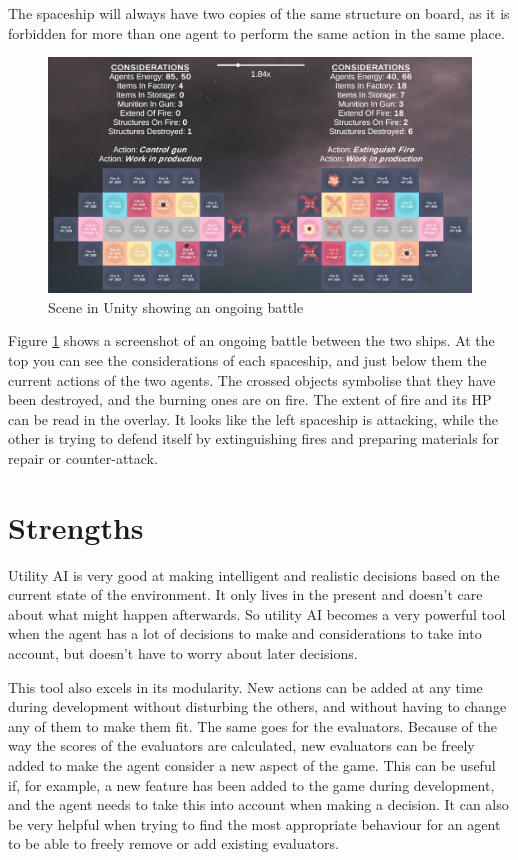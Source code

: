 The spaceship will always have two copies of the same structure on board, as it is forbidden for more than one agent to perform the same action in the same place.

\begin{figure}[H]
	\centering
		\includegraphics[scale=0.265]{images/utility_ai_scene_both_spaceship.png}
	\caption{Scene in Unity showing an ongoing battle}
	\label{fig:utility_ai_scene_both_spaceship}
\end{figure}

Figure \ref{fig:utility_ai_scene_both_spaceship} shows a screenshot of an ongoing battle between the two ships. At the top you can see the considerations of each spaceship, and just below them the current actions of the two agents. The crossed objects symbolise that they have been destroyed, and the burning ones are on fire. The extent of fire and its HP can be read in the overlay. It looks like the left spaceship is attacking, while the other is trying to defend itself by extinguishing fires and preparing materials for repair or counter-attack.

\newpage

\section{Strengths}
\label{sec:utilityai_strengths}

Utility AI is very good at making intelligent and realistic decisions based on the current state of the environment. It only lives in the present and doesn't care about what might happen afterwards. So utility AI becomes a very powerful tool when the agent has a lot of decisions to make and considerations to take into account, but doesn't have to worry about later decisions.

This tool also excels in its modularity. New actions can be added at any time during development without disturbing the others, and without having to change any of them to make them fit. The same goes for the evaluators. Because of the way the scores of the evaluators are calculated, new evaluators can be freely added to make the agent consider a new aspect of the game. This can be useful if, for example, a new feature has been added to the game during development, and the agent needs to take this into account when making a decision. It can also be very helpful when trying to find the most appropriate behaviour for an agent to be able to freely remove or add existing evaluators.

